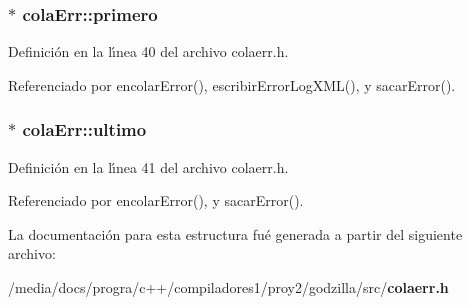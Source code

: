 \subsubsection{$\ast$ {\bf cola\-Err::primero}}\label{structcolaErr_o0}




Definici\'{o}n en la l\'{\i}nea 40 del archivo colaerr.h.

Referenciado por encolar\-Error(), escribir\-Error\-Log\-XML(), y sacar\-Error().
\subsubsection{$\ast$ {\bf cola\-Err::ultimo}}\label{structcolaErr_o1}




Definici\'{o}n en la l\'{\i}nea 41 del archivo colaerr.h.

Referenciado por encolar\-Error(), y sacar\-Error().

La documentaci\'{o}n para esta estructura fu\'{e} generada a partir del siguiente archivo:\begin{CompactItemize}
\item 
/media/docs/progra/c++/compiladores1/proy2/godzilla/src/{\bf colaerr.h}\end{CompactItemize}
